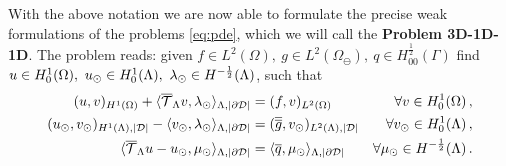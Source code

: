 \documentclass[r]{siamart171218}
\newcommand{\kent}[1]{{\color{black}#1}}
\newcommand{\paolo}[1]{{\color{black}#1}}
\begin{document}

\kent{With the above notation we are now able to formulate the precise weak formulations of the problems \eqref{eq:pde}, which we will call the \textbf{Problem 3D-1D-1D}. The problem} reads:
\paolo{given $f\in L^2(\Omega), \ g \in L^2(\Omega_{\ominus}), \ q \in H^\frac12_{00}(\Gamma)$}
find $u \in H^1_0(\Omega),\ u_{\odot} \in H^1_0(\Lambda), \ \lambda_{\odot} \in H^{-\frac 1 2}(\Lambda)$, such that
\begin{subequations}\label{eq:problem2}
\begin{align}
\label{eq:problem2a}
(u,v)_{H^1(\Omega)} 
+  \langle \mtrace v, \ld \rangle_{\Lambda, |\DD|} &= 
(f,v)_{L^2(\Omega)} &\forall v \in H^1_0(\Omega)\, ,
\\
\label{eq:problem2b}
(\ud,\vd)_{H^1(\Lambda),|\D|} - \langle  \vd, \ld \rangle_{\Lambda, |\DD|} 
&=  (\avrd{g},\vd)_{L^2(\Lambda),|\D|}
&\forall \vd \in H^1_0(\Lambda)\, ,
\\
\label{eq:problem2c}
\langle \mtrace u -   \ud, \md \rangle_{\Lambda,|\DD|} 
&= \paolo{\langle \avrc{q},\md\rangle_{\Lambda,|\DD|}}
&\forall \md \in H^{-\frac 1 2}(\Lambda)\,.
\end{align}
\end{subequations}
\end{document}

